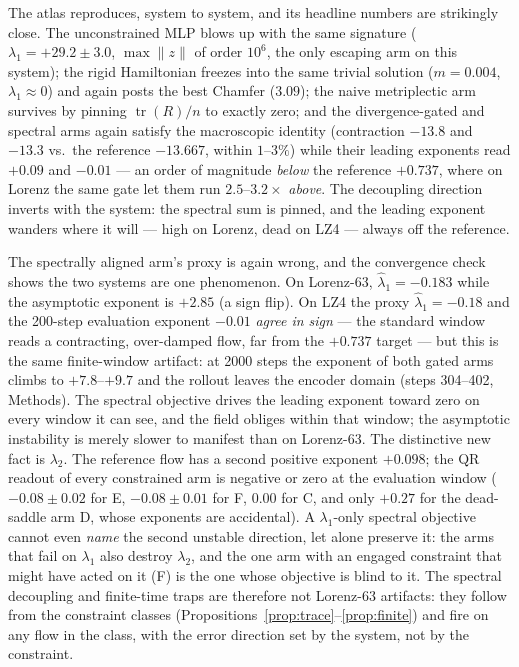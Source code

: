 \documentclass[11pt]{article}
\newcommand{\tr}{\operatorname{tr}}
\begin{document}
The atlas reproduces, system to system, and its headline numbers are
strikingly close. The unconstrained MLP blows up with the same
signature ($\lambda_1=+29.2\pm3.0$, $\max\|z\|$ of order $10^6$, the
only escaping arm on this system); the rigid Hamiltonian freezes into
the same trivial solution ($m=0.004$, $\lambda_1\approx0$) and again
posts the best Chamfer ($3.09$); the naive metriplectic arm survives
by pinning $\tr(R)/n$ to exactly zero; and the divergence-gated and
spectral arms again satisfy the macroscopic identity (contraction
$-13.8$ and $-13.3$ vs.\ the reference $-13.667$, within $1$--$3\%$)
while their leading exponents read $+0.09$ and $-0.01$ --- an order of
magnitude \emph{below} the reference $+0.737$, where on Lorenz the same
gate let them run $2.5$--$3.2\times$ \emph{above}. The decoupling
direction inverts with the system: the spectral sum is pinned, and the
leading exponent wanders where it will --- high on Lorenz, dead on
LZ4 --- always off the reference.

The spectrally aligned arm's proxy is again wrong, and the
convergence check shows the two systems are one phenomenon. On
Lorenz-63, $\hat\lambda_1=-0.183$ while the asymptotic exponent is
$+2.85$ (a sign flip). On LZ4 the proxy $\hat\lambda_1=-0.18$ and the
200-step evaluation exponent $-0.01$ \emph{agree in sign} --- the
standard window reads a contracting, over-damped flow, far from the
$+0.737$ target --- but this is the same finite-window artifact: at
2000 steps the exponent of both gated arms climbs to $+7.8$--$+9.7$
and the rollout leaves the encoder domain (steps 304--402, Methods).
The spectral objective drives the leading exponent toward zero on
every window it can see, and the field obliges within that window; the
asymptotic instability is merely slower to manifest than on Lorenz-63.
The distinctive new fact is $\lambda_2$. The reference flow has a
second positive exponent $+0.098$; the QR readout of every constrained
arm is negative or zero at the evaluation window ($-0.08\pm0.02$ for
E, $-0.08\pm0.01$ for F, $0.00$ for C, and only $+0.27$ for the dead-
saddle arm D, whose exponents are accidental). A $\lambda_1$-only
spectral objective cannot even \emph{name} the second unstable
direction, let alone preserve it: the arms that fail on $\lambda_1$
also destroy $\lambda_2$, and the one arm with an engaged constraint
that might have acted on it (F) is the one whose objective is blind to
it. The spectral decoupling and finite-time traps are therefore not
Lorenz-63 artifacts: they follow from the constraint classes
(Propositions~\ref{prop:trace}--\ref{prop:finite}) and fire on any
flow in the class, with the error direction set by the system, not by
the constraint.
\end{document}
